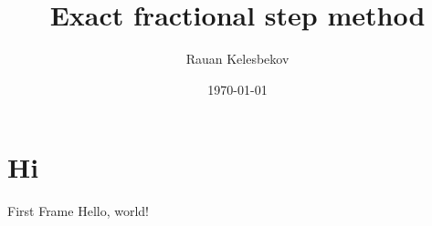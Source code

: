 \documentclass{beamer}
\title{Exact fractional step method}
\date{\today}
\author{Rauan Kelesbekov}
\institute{University of Alberta}
\begin{document}
  \maketitle
  \section{Hi}
  \begin{frame}{First Frame}
    Hello, world!
  \end{frame}
\end{document}
